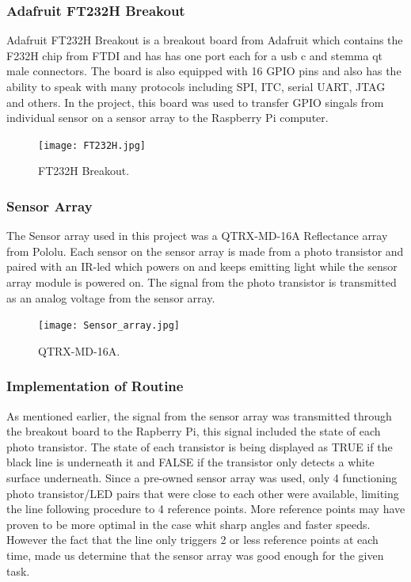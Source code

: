 \subsubsection{Adafruit FT232H Breakout}
Adafruit FT232H Breakout is a breakout board from Adafruit which contains the F232H chip from FTDI and has has one port each for a usb c and stemma qt male connectors. The board is also equipped with 16 GPIO pins and also has the ability to speak with many protocols including SPI, ITC, serial UART, JTAG and others. In the project, this board was used to transfer GPIO singals from individual sensor on a sensor array to the Raspberry Pi computer. 
\begin{figure}[H]
    \centering
    \texttt{[image: FT232H.jpg]}
    \caption{FT232H Breakout.}
    \label{FT232H}
\end{figure}

\subsubsection{Sensor Array}
The Sensor array used in this project was a QTRX-MD-16A Reflectance array from Pololu. Each sensor on the sensor array is made from a photo transistor and paired with an IR-led which powers on and keeps emitting light while the sensor array module is powered on. The signal from the photo transistor is transmitted as an analog voltage from the sensor array. 
\begin{figure}[H]
    \centering
    \texttt{[image: Sensor\_array.jpg]}
    \caption{QTRX-MD-16A.}
    \label{Sensor_array}
\end{figure}
\subsubsection{Implementation of Routine}
As mentioned earlier, the signal from the sensor array was transmitted through the breakout board to the Rapberry Pi, this signal included the state of each photo transistor. The state of each transistor is being displayed as TRUE if the black line is underneath it and FALSE if the transistor only detects a white surface underneath. Since a pre-owned sensor array was used, only 4 functioning photo transistor/LED pairs that were close to each other were available, limiting the line following procedure to 4 reference points. More reference points may have proven to be more optimal in the case whit sharp angles and faster speeds. However the fact that the line only triggers 2 or less reference points at each time, made us determine that the sensor array was good enough for the given task.  \newline


